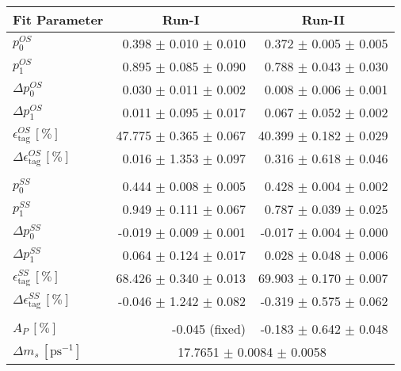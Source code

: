 \begin{tabular}{l r r } 
\hline
\hline
\multicolumn{1}{c}{Fit Parameter} & \multicolumn{1}{c}{Run-I} & \multicolumn{1}{c}{Run-II}  \\ 
\hline
$p_{0}^{OS}$ & 0.398 $\pm$ 0.010 $\pm$ 0.010 & 0.372 $\pm$ 0.005 $\pm$ 0.005 \\ 
$p_{1}^{OS}$ & 0.895 $\pm$ 0.085 $\pm$ 0.090 & 0.788 $\pm$ 0.043 $\pm$ 0.030 \\ 
$\Delta p_{0}^{OS}$ & 0.030 $\pm$ 0.011 $\pm$ 0.002 & 0.008 $\pm$ 0.006 $\pm$ 0.001 \\ 
$\Delta p_{1}^{OS}$ & 0.011 $\pm$ 0.095 $\pm$ 0.017 & 0.067 $\pm$ 0.052 $\pm$ 0.002 \\ 
$\epsilon_{\text{tag}}^{OS} \, [\%]$ & 47.775 $\pm$ 0.365 $\pm$ 0.067 & 40.399 $\pm$ 0.182 $\pm$ 0.029 \\ 
$\Delta \epsilon_{\text{tag}}^{OS} \, [\%]$ & 0.016 $\pm$ 1.353 $\pm$ 0.097 & 0.316 $\pm$ 0.618 $\pm$ 0.046 \\ 
 \\ 
$p_{0}^{SS}$ & 0.444 $\pm$ 0.008 $\pm$ 0.005 & 0.428 $\pm$ 0.004 $\pm$ 0.002 \\ 
$p_{1}^{SS}$ & 0.949 $\pm$ 0.111 $\pm$ 0.067 & 0.787 $\pm$ 0.039 $\pm$ 0.025 \\ 
$\Delta p_{0}^{SS}$ & -0.019 $\pm$ 0.009 $\pm$ 0.001 & -0.017 $\pm$ 0.004 $\pm$ 0.000 \\ 
$\Delta p_{1}^{SS}$ & 0.064 $\pm$ 0.124 $\pm$ 0.017 & 0.028 $\pm$ 0.048 $\pm$ 0.006 \\ 
$\epsilon_{\text{tag}}^{SS} \, [\%]$ & 68.426 $\pm$ 0.340 $\pm$ 0.013 & 69.903 $\pm$ 0.170 $\pm$ 0.007 \\ 
$\Delta \epsilon_{\text{tag}}^{SS} \, [\%]$ & -0.046 $\pm$ 1.242 $\pm$ 0.082 & -0.319 $\pm$ 0.575 $\pm$ 0.062 \\ 
 \\ 
$A_{P} \, [\%]$ & -0.045 (fixed) & -0.183 $\pm$ 0.642 $\pm$ 0.048 \\ 
\hline
$\Delta m_{s} \, [\text{ps}^{-1}]$ & \multicolumn{2}{c}{ 17.7651 $\pm$ 0.0084 $\pm$ 0.0058 }  \\ 
\hline
\hline
\end{tabular}
